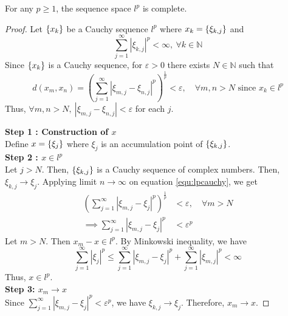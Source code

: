 \begin{theorem}
	For any $p \ge 1$, the sequence space $l^p$ is complete.
\end{theorem}
\begin{proof}
	Let $\{x_k\}$ be a Cauchy sequence $l^p$ where $x_k = \{\xi_{k,j}\}$ and
	$$ \sum_{j = 1}^\infty \left| \xi_{k,j} \right|^p < \infty,\ \forall k \in \mathbb{N} $$
	Since $\{x_k\}$ is a Cauchy sequence, for $\varepsilon > 0$ there exists $N \in \mathbb{N}$ such that
	\begin{equation}
		\label{equ:lpcauchy}
		d(x_m,x_n) = \left( \sum_{j=1}^\infty |\xi_{m,j} - \xi_{n,j}|^p \right) ^\frac{1}{p} < \varepsilon,\quad \forall m,n > N \text{ since } x_k \in l^p
	\end{equation}
	Thus, $\forall m,n > N,\ |\xi_{m,j} - \xi_{n,j}| < \varepsilon$ for each $j$.

	\textbf{Step 1 : Construction of $x$}\\
	Define $x = \{\xi_j\}$ where $\xi_j$ is an accumulation point of $\{\xi_{k,j}\}$.\\%

	\textbf{Step 2 : $x \in l^p$}\\
	Let $j > N$.
	Then, $\{\xi_{k,j}\}$ is a Cauchy sequence of complex numbers.
	Then, $\xi_{k,j} \to \xi_j$.
	Applying limit $n \to \infty$ on equation \ref{equ:lpcauchy}, we get
	\begin{align*}
		\left( \sum_{j=1}^\infty |\xi_{m,j} - \xi_j|^p \right) ^\frac{1}{p} & < \varepsilon,\quad \forall m > N \\
		\implies \sum_{j=1}^\infty |\xi_{m,j} - \xi_j|^p  & < \varepsilon^p
	\end{align*}
	Let $m > N$. Then $x_m - x \in l^p$. By Minkowski inequality, we have
	\begin{equation}
		\sum_{j=1}^\infty |\xi_j|^p  \le \sum_{j=1}^\infty |\xi_{m,j}-\xi_j|^p + \sum_{j=1}^\infty |\xi_{m,j}|^p  < \infty
	\end{equation}
	Thus, $x \in l^p$. \\
	\textbf{Step 3: $x_m \to x$}\\
	Since $\displaystyle \sum_{j=1}^\infty |\xi_{m,j} - \xi_j|^p < \varepsilon^p$, we have $\xi_{k,j} \to \xi_j$.
	Therefore, $x_m \to x$.
\end{proof}


